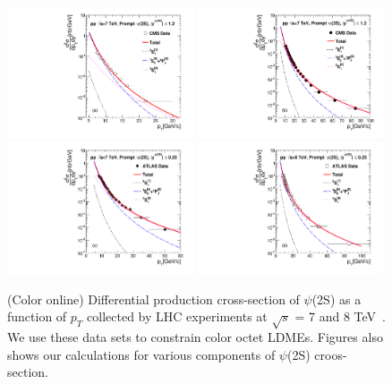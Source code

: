 \documentclass[aps,prc,preprint,superscriptaddress,showpacs,showkeys,amsmath]{revtex4-1}
\begin{document}
\begin{figure}
\includegraphics[width=0.49\textwidth]{Figures/Psi2S/Psi2S_CMS_LowPt.pdf}
\includegraphics[width=0.49\textwidth]{Figures/Psi2S/Psi2S_CMS_HighPt.pdf}
\includegraphics[width=0.49\textwidth]{Figures/Psi2S/Psi2S_ATLAS.pdf}
\includegraphics[width=0.49\textwidth]{Figures/Psi2S/Psi2S_ATLAS_8TeV.pdf}
\caption{(Color online) Differential production cross-section of $\psi$(2S) as a function of $p_{T}$ 
collected by LHC experiments at $\sqrt{s}$ = 7 and 8 TeV~\cite{Chatrchyan:2011kc,Khachatryan:2015rra,Aad:2015duc}. 
We use these data sets to constrain color octet LDMEs. Figures also shows our calculations for various components 
of $\psi$(2S) croos-section.}
\label{Fig:LDMEPsi2S}
\end{figure}
\end{document}
